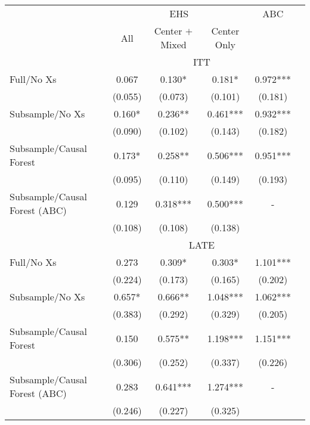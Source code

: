 \begin{tabular}{lccccc}
\toprule 
\midrule 
 & \multicolumn{3}{c}{EHS} & ABC \\
 \cmidrule(lr){2-4} 
 & All & Center $+$ Mixed & Center Only &  \\
\midrule 
 & \multicolumn{4}{c}{ITT} \\
 \cmidrule(lr){2-5} 
Full/No Xs & 0.067 & 0.130* & 0.181* & 0.972*** \\
 & (0.055) & (0.073) & (0.101) & (0.181) \\
Subsample/No Xs & 0.160* & 0.236** & 0.461*** & 0.932*** \\
 & (0.090) & (0.102) & (0.143) & (0.182) \\
Subsample/Causal Forest & 0.173* & 0.258** & 0.506*** & 0.951*** \\
 & (0.095) & (0.110) & (0.149) & (0.193) \\
Subsample/Causal Forest (ABC) & 0.129 & 0.318*** & 0.500*** & - \\
 & (0.108) & (0.108) & (0.138) \\
\midrule 
 & \multicolumn{4}{c}{LATE} \\
 \cmidrule(lr){2-5} 
Full/No Xs & 0.273 & 0.309* & 0.303* & 1.101*** \\
 & (0.224) & (0.173) & (0.165) & (0.202) \\
Subsample/No Xs & 0.657* & 0.666** & 1.048*** & 1.062*** \\
 & (0.383) & (0.292) & (0.329) & (0.205) \\
Subsample/Causal Forest & 0.150 & 0.575** & 1.198*** & 1.151*** \\
 & (0.306) & (0.252) & (0.337) & (0.226) \\
Subsample/Causal Forest (ABC) & 0.283 & 0.641*** & 1.274*** & - \\
 & (0.246) & (0.227) & (0.325) \\
\midrule 
\bottomrule 
\end{tabular}
